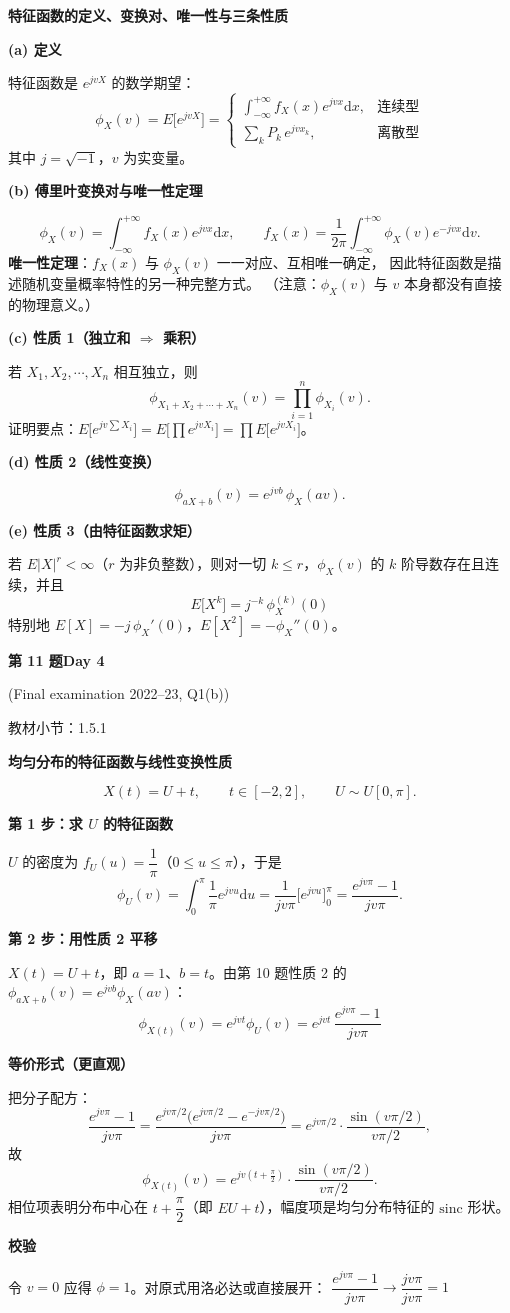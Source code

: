 \documentclass[10.5pt,fontset=fandol]{ctexart}
\newcommand{\key}[1]{\par\vspace{4pt}\noindent\textbf{\color{navy}#1}\par\vspace{2pt}}
\newcommand{\dd}{\mathrm d}\newcommand{\Var}{\operatorname{Var}}\newcommand{\Cov}{\operatorname{Cov}}
\newcommand{\qtitle}[2]{\par\addvspace{1.2em}\Needspace{8\baselineskip}\begin{tcolorbox}[colback=navy,colframe=navy,arc=1.5pt,boxrule=0pt]\color{white}\large\bfseries #1\hfill\small #2\end{tcolorbox}}
\begin{document}
\noindent\textbf{特征函数的定义、变换对、唯一性与三条性质}\par\smallskip\begin{tcolorbox}[breakable,colback=qbg,colframe=qbg,boxrule=0pt]\key{(a) 定义}
特征函数是 $e^{jvX}$ 的数学期望：
\[
\phi_X(v)=E\big[e^{jvX}\big]=
\begin{cases}
\displaystyle\int_{-\infty}^{+\infty}f_X(x)e^{jvx}\dd x, & \text{连续型}\\[8pt]
\displaystyle\sum_k P_k\,e^{jvx_k}, & \text{离散型}
\end{cases}
\]
其中 $j=\sqrt{-1}$，$v$ 为实变量。

\key{(b) 傅里叶变换对与唯一性定理}
\[
\phi_X(v)=\int_{-\infty}^{+\infty}f_X(x)e^{jvx}\dd x,
\qquad
f_X(x)=\frac{1}{2\pi}\int_{-\infty}^{+\infty}\phi_X(v)e^{-jvx}\dd v .
\]
\textbf{唯一性定理}：$f_X(x)$ 与 $\phi_X(v)$ 一一对应、互相唯一确定，
因此特征函数是描述随机变量概率特性的另一种完整方式。
（注意：$\phi_X(v)$ 与 $v$ 本身都没有直接的物理意义。）

\key{(c) 性质 1（独立和 $\Rightarrow$ 乘积）}
若 $X_1,X_2,\cdots,X_n$ 相互独立，则
\[
\phi_{X_1+X_2+\cdots+X_n}(v)=\prod_{i=1}^{n}\phi_{X_i}(v).
\]
证明要点：$E\big[e^{jv\sum X_i}\big]=E\big[\prod e^{jvX_i}\big]=\prod E\big[e^{jvX_i}\big]$。

\key{(d) 性质 2（线性变换）}
\[
\phi_{aX+b}(v)=e^{jvb}\,\phi_X(av).
\]

\key{(e) 性质 3（由特征函数求矩）}
若 $E|X|^r<\infty$（$r$ 为非负整数），则对一切 $k\le r$，$\phi_X(v)$ 的 $k$ 阶导数存在且连续，并且
\[
\boxed{\,E\big[X^k\big]=j^{-k}\,\phi_X^{(k)}(0)\,}
\]
特别地 $E[X]=-j\,\phi_X'(0)$，$E[X^2]=-\phi_X''(0)$。
\end{tcolorbox}
\qtitle{第 11 题}{Day 4}
{\small\color{accentred}(Final examination 2022--23, Q1(b))}\par\smallskip
{\small\color{muted}教材小节：1.5.1}\par\medskip
\noindent\textbf{均匀分布的特征函数与线性变换性质}\par\smallskip\begin{tcolorbox}[breakable,colback=qbg,colframe=qbg,boxrule=0pt]\[
X(t)=U+t,\qquad t\in[-2,2],\qquad U\sim U[0,\pi].
\]

\key{第 1 步：求 $U$ 的特征函数}
$U$ 的密度为 $f_U(u)=\dfrac1\pi$（$0\le u\le\pi$），于是
\[
\phi_U(v)=\int_0^\pi\frac1\pi e^{jvu}\dd u
=\frac{1}{jv\pi}\Big[e^{jvu}\Big]_0^\pi
=\frac{e^{jv\pi}-1}{jv\pi}.
\]

\key{第 2 步：用性质 2 平移}
$X(t)=U+t$，即 $a=1$、$b=t$。由第 10 题性质 2 的 $\phi_{aX+b}(v)=e^{jvb}\phi_X(av)$：
\[
\boxed{\phi_{X(t)}(v)=e^{jvt}\phi_U(v)=e^{jvt}\,\frac{e^{jv\pi}-1}{jv\pi}}
\]

\key{等价形式（更直观）}
把分子配方：
\[
\frac{e^{jv\pi}-1}{jv\pi}
=\frac{e^{jv\pi/2}\big(e^{jv\pi/2}-e^{-jv\pi/2}\big)}{jv\pi}
=e^{jv\pi/2}\cdot\frac{\sin(v\pi/2)}{v\pi/2},
\]
故
\[
\phi_{X(t)}(v)=e^{jv\left(t+\frac{\pi}{2}\right)}\cdot\frac{\sin(v\pi/2)}{v\pi/2}.
\]
相位项表明分布中心在 $t+\dfrac\pi2$（即 $EU+t$），幅度项是均匀分布特征的 $\mathrm{sinc}$ 形状。

\key{校验}
令 $v=0$ 应得 $\phi=1$。对原式用洛必达或直接展开：
$\dfrac{e^{jv\pi}-1}{jv\pi}\to\dfrac{jv\pi}{jv\pi}=1$ \checkmark
\end{tcolorbox}
\end{document}
